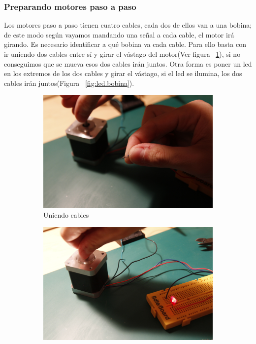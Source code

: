 		\subsubsection{Preparando motores paso a paso}
		Los motores paso a paso tienen cuatro cables, cada dos de ellos van a una bobina; de este modo según vayamos mandando una señal a cada cable, el motor irá girando. Es necesario identificar a qué bobina va cada cable. Para ello basta con ir uniendo dos cables entre sí y girar el vástago del motor(Ver figura ~\ref{fig:cable.bobina}), si no conseguimos que se mueva esos dos cables irán juntos. Otra forma es poner un led en los extremos de los dos cables y girar el vástago, si el led se ilumina, los dos cables irán juntos(Figura ~\ref{fig:led.bobina}).\\

				\begin{figure}[H]
				        \centering
				        \begin{subfigure}[b]{0.4\textwidth}
				                \centering
				                \includegraphics[width=\textwidth]{../../Fotos/19.jpg}
				                \caption{Uniendo cables }
				                \label{fig:cable.bobina}
				        \end{subfigure}
				        \begin{subfigure}[b]{0.4\textwidth}
				                \centering
				                \includegraphics[width=\textwidth]{../../Fotos/18.jpg}

\end{subfigure}
\end{figure}
